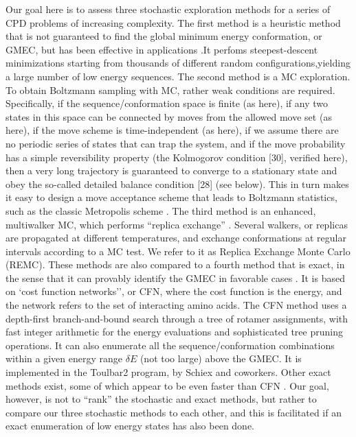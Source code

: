 Our goal here is to assess three stochastic exploration methods for a series of CPD problems of increasing complexity.
The first method is a heuristic method that is not guaranteed to find the global minimum energy conformation, or GMEC,
but has been effective in applications \cite{Wernisch00,Schmidt09,Schmidt10}.It perfoms steepest-descent minimizations starting from thousands of different random configurations,yielding a large number of low energy sequences.
The second method is a MC exploration.
To obtain Boltzmann sampling with MC, rather weak conditions are required.
Specifically, if the sequence/conformation space is finite (as here), if any two states in this space can be connected by moves from the allowed move set (as here), if the move scheme is time-independent (as here), if we assume there are no periodic series of states that can trap the system, and if the move probability has a simple reversibility property (the Kolmogorov condition [30], verified here), then a very long trajectory is guaranteed to converge to a stationary state and obey the so-called detailed balance condition [28] (see below).
This in turn makes it easy to design a move acceptance scheme that leads to Boltzmann statistics, such as the classic Metropolis scheme \cite{Metropolis53,FrenkelBK,GrimmetBK}.
The third method is an enhanced, multiwalker MC, which performs ``replica exchange'' \cite{Sugita99,Kofke02,Earl05}.
Several walkers, or replicas are propagated at different temperatures, and exchange conformations at regular intervals according to a MC test.
We refer to it as Replica Exchange Monte Carlo (REMC).
These methods are also compared to a fourth method that is exact, in the sense that it can provably identify the GMEC in favorable cases \cite{Traore13,Allouche14}.
It is based on `cost function networks'', or CFN, where the cost function is the energy, and the network refers to the set of interacting amino acids.
The CFN method uses a depth-first branch-and-bound search through a tree of rotamer assignments, with fast integer arithmetic for the energy evaluations and sophisticated tree pruning operations.
It can also enumerate all the sequence/conformation combinations within a given energy range $\delta E$ (not too large) above the GMEC.
It is implemented in the Toulbar2 program, by Schiex and coworkers.
Other exact methods exist, some of which appear to be even faster than CFN \cite{Hong09}.
Our goal, however, is not to ``rank'' the stochastic and exact methods, but rather to compare our three stochastic methods to each other, and this is facilitated if an exact enumeration of low energy states has also been done.

